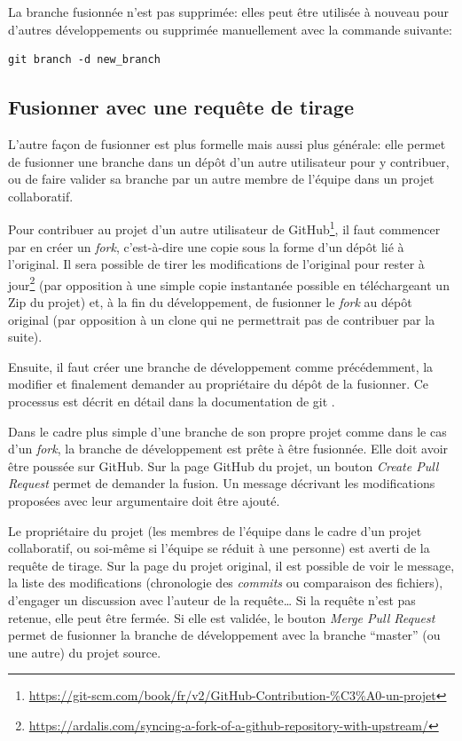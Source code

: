 \documentclass[
  11pt,
  french,
  a4paper,
  extrafontsizes,onecolumn,openright
  ]{memoir}
\begin{document}
La branche fusionnée n'est pas supprimée: elles peut être utilisée à nouveau pour d'autres développements ou supprimée manuellement avec la commande suivante:

\begin{verbatim}
git branch -d new_branch
\end{verbatim}

\hypertarget{fusionner-avec-une-requuxeate-de-tirage}{%
\subsection{Fusionner avec une requête de tirage}\label{fusionner-avec-une-requuxeate-de-tirage}}

L'autre façon de fusionner est plus formelle mais aussi plus générale: elle permet de fusionner une branche dans un dépôt d'un autre utilisateur pour y contribuer, ou de faire valider sa branche par un autre membre de l'équipe dans un projet collaboratif.

Pour contribuer au projet d'un autre utilisateur de GitHub\footnote{\url{https://git-scm.com/book/fr/v2/GitHub-Contribution-\%C3\%A0-un-projet}}, il faut commencer par en créer un \emph{fork}, c'est-à-dire une copie sous la forme d'un dépôt lié à l'original.
Il sera possible de tirer les modifications de l'original pour rester à jour\footnote{\url{https://ardalis.com/syncing-a-fork-of-a-github-repository-with-upstream/}} (par opposition à une simple copie instantanée possible en téléchargeant un Zip du projet) et, à la fin du développement, de fusionner le \emph{fork} au dépôt original (par opposition à un clone qui ne permettrait pas de contribuer par la suite).

Ensuite, il faut créer une branche de développement comme précédemment, la modifier et finalement demander au propriétaire du dépôt de la fusionner.
Ce processus est décrit en détail dans la documentation de git .

Dans le cadre plus simple d'une branche de son propre projet comme dans le cas d'un \emph{fork}, la branche de développement est prête à être fusionnée.
Elle doit avoir être poussée sur GitHub.
Sur la page GitHub du projet, un bouton \emph{Create Pull Request} permet de demander la fusion.
Un message décrivant les modifications proposées avec leur argumentaire doit être ajouté.

Le propriétaire du projet (les membres de l'équipe dans le cadre d'un projet collaboratif, ou soi-même si l'équipe se réduit à une personne) est averti de la requête de tirage.
Sur la page du projet original, il est possible de voir le message, la liste des modifications (chronologie des \emph{commits} ou comparaison des fichiers), d'engager un discussion avec l'auteur de la requête\ldots{}
Si la requête n'est pas retenue, elle peut être fermée.
Si elle est validée, le bouton \emph{Merge Pull Request} permet de fusionner la branche de développement avec la branche ``master'' (ou une autre) du projet source.
\end{document}

